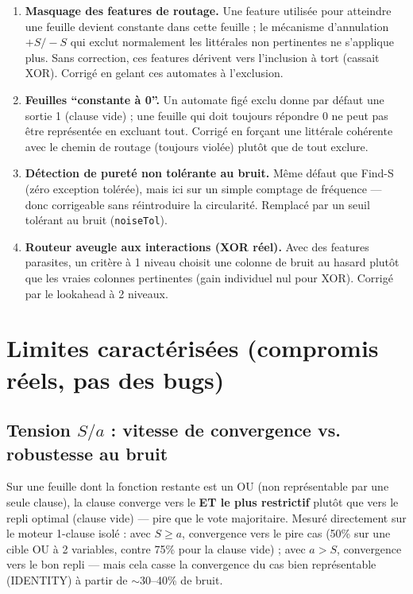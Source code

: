 \documentclass[12pt,a4paper]{article}
\theoremstyle{remark}
\begin{document}
\begin{enumerate}
  \item \textbf{Masquage des features de routage.} Une feature utilisée
        pour atteindre une feuille devient constante dans cette feuille ; le
        mécanisme d'annulation $+S/-S$ qui exclut normalement les
        littérales non pertinentes ne s'applique plus. Sans correction, ces
        features dérivent vers l'inclusion à tort (cassait XOR). Corrigé en
        gelant ces automates à l'exclusion.
  \item \textbf{Feuilles ``constante à 0''.} Un automate figé exclu donne
        par défaut une sortie 1 (clause vide) ; une feuille qui doit
        toujours répondre 0 ne peut pas être représentée en excluant tout.
        Corrigé en forçant une littérale cohérente avec le chemin de
        routage (toujours violée) plutôt que de tout exclure.
  \item \textbf{Détection de pureté non tolérante au bruit.} Même défaut
        que Find-S (zéro exception tolérée), mais ici sur un simple
        comptage de fréquence --- donc corrigeable sans réintroduire la
        circularité. Remplacé par un seuil tolérant au bruit (\texttt{noiseTol}).
  \item \textbf{Routeur aveugle aux interactions (XOR réel).} Avec des
        features parasites, un critère à 1 niveau choisit une colonne de
        bruit au hasard plutôt que les vraies colonnes pertinentes (gain
        individuel nul pour XOR). Corrigé par le lookahead à 2 niveaux.
\end{enumerate}

\section{Limites caractérisées (compromis réels, pas des bugs)}

\subsection{Tension $S/a$ : vitesse de convergence vs. robustesse au bruit}

Sur une feuille dont la fonction restante est un OU (non représentable par
une seule clause), la clause converge vers le \textbf{ET le plus
restrictif} plutôt que vers le repli optimal (clause vide) --- pire que le
vote majoritaire. Mesuré directement sur le moteur 1-clause isolé : avec
$S \geq a$, convergence vers le pire cas (50\% sur une cible OU à 2
variables, contre 75\% pour la clause vide) ; avec $a > S$, convergence vers
le bon repli --- mais cela casse la convergence du cas bien représentable
(IDENTITY) à partir de $\sim$30--40\% de bruit.
\end{document}
